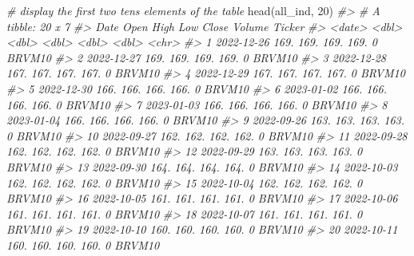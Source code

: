 \documentclass[
]{article}
\newenvironment{Shaded}{\begin{snugshade}}{\end{snugshade}}
\newcommand{\CommentTok}[1]{\textcolor[rgb]{0.56,0.35,0.01}{\textit{#1}}}
\newcommand{\DecValTok}[1]{\textcolor[rgb]{0.00,0.00,0.81}{#1}}
\newcommand{\FunctionTok}[1]{\textcolor[rgb]{0.00,0.00,0.00}{#1}}
\newcommand{\NormalTok}[1]{#1}
\begin{document}
\begin{Shaded}
\begin{Highlighting}[]
\CommentTok{\# display the first two tens elements of the table}
\FunctionTok{head}\NormalTok{(all\_ind, }\DecValTok{20}\NormalTok{)}
\CommentTok{\#\textgreater{} \# A tibble: 20 x 7}
\CommentTok{\#\textgreater{}    Date        Open  High   Low Close Volume Ticker}
\CommentTok{\#\textgreater{}    \textless{}date\textgreater{}     \textless{}dbl\textgreater{} \textless{}dbl\textgreater{} \textless{}dbl\textgreater{} \textless{}dbl\textgreater{}  \textless{}dbl\textgreater{} \textless{}chr\textgreater{} }
\CommentTok{\#\textgreater{}  1 2022{-}12{-}26  169.  169.  169.  169.      0 BRVM10}
\CommentTok{\#\textgreater{}  2 2022{-}12{-}27  169.  169.  169.  169.      0 BRVM10}
\CommentTok{\#\textgreater{}  3 2022{-}12{-}28  167.  167.  167.  167.      0 BRVM10}
\CommentTok{\#\textgreater{}  4 2022{-}12{-}29  167.  167.  167.  167.      0 BRVM10}
\CommentTok{\#\textgreater{}  5 2022{-}12{-}30  166.  166.  166.  166.      0 BRVM10}
\CommentTok{\#\textgreater{}  6 2023{-}01{-}02  166.  166.  166.  166.      0 BRVM10}
\CommentTok{\#\textgreater{}  7 2023{-}01{-}03  166.  166.  166.  166.      0 BRVM10}
\CommentTok{\#\textgreater{}  8 2023{-}01{-}04  166.  166.  166.  166.      0 BRVM10}
\CommentTok{\#\textgreater{}  9 2022{-}09{-}26  163.  163.  163.  163.      0 BRVM10}
\CommentTok{\#\textgreater{} 10 2022{-}09{-}27  162.  162.  162.  162.      0 BRVM10}
\CommentTok{\#\textgreater{} 11 2022{-}09{-}28  162.  162.  162.  162.      0 BRVM10}
\CommentTok{\#\textgreater{} 12 2022{-}09{-}29  163.  163.  163.  163.      0 BRVM10}
\CommentTok{\#\textgreater{} 13 2022{-}09{-}30  164.  164.  164.  164.      0 BRVM10}
\CommentTok{\#\textgreater{} 14 2022{-}10{-}03  162.  162.  162.  162.      0 BRVM10}
\CommentTok{\#\textgreater{} 15 2022{-}10{-}04  162.  162.  162.  162.      0 BRVM10}
\CommentTok{\#\textgreater{} 16 2022{-}10{-}05  161.  161.  161.  161.      0 BRVM10}
\CommentTok{\#\textgreater{} 17 2022{-}10{-}06  161.  161.  161.  161.      0 BRVM10}
\CommentTok{\#\textgreater{} 18 2022{-}10{-}07  161.  161.  161.  161.      0 BRVM10}
\CommentTok{\#\textgreater{} 19 2022{-}10{-}10  160.  160.  160.  160.      0 BRVM10}
\CommentTok{\#\textgreater{} 20 2022{-}10{-}11  160.  160.  160.  160.      0 BRVM10}


\end{Highlighting}
\end{Shaded}
\end{document}
